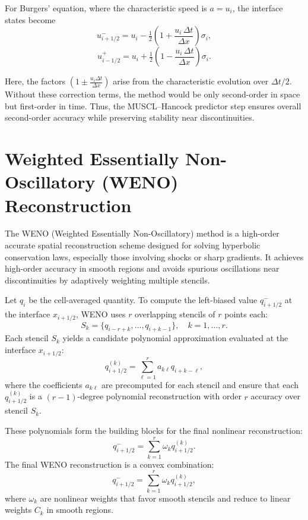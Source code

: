 \documentclass{article}
\begin{document}
For Burgers' equation, where the characteristic speed is $a = u_i$, the interface states become
\begin{equation}
u_{i+1/2}^- = u_i - \tfrac{1}{2}\!\left(1 + \frac{u_i \,\Delta t}{\Delta x}\right)\sigma_i,
\end{equation}
\begin{equation}
u_{i-1/2}^+ = u_i + \tfrac{1}{2}\!\left(1 - \frac{u_i \,\Delta t}{\Delta x}\right)\sigma_i.
\end{equation}

Here, the factors $\left(1 \pm \tfrac{u_i \Delta t}{\Delta x}\right)$ arise from the characteristic evolution over $\Delta t/2$. Without these correction terms, the method would be only second-order in space but first-order in time. Thus, the MUSCL--Hancock predictor step ensures overall second-order accuracy while preserving stability near discontinuities.

\section{Weighted Essentially Non-Oscillatory (WENO) Reconstruction}

The WENO (Weighted Essentially Non-Oscillatory) method is a high-order accurate spatial reconstruction scheme designed for solving hyperbolic conservation laws, especially those involving shocks or sharp gradients. It achieves high-order accuracy in smooth regions and avoids spurious oscillations near discontinuities by adaptively weighting multiple stencils.

Let $q_i$ be the cell-averaged quantity. To compute the left-biased value $q_{i+1/2}^-$ at the interface $x_{i+1/2}$, WENO uses $r$ overlapping stencils of $r$ points each:
\[
S_k = \{ q_{i - r + k}, \dots, q_{i + k - 1} \}, \quad k = 1, \dots, r.
\]
Each stencil $S_k$ yields a candidate polynomial approximation evaluated at the interface $x_{i+1/2}$:
\[
q^{(k)}_{i+1/2} = \sum_{\ell=1}^r a_{k\ell} q_{i + k - \ell},
\]
where the coefficients $a_{k\ell}$ are precomputed for each stencil and ensure that each $q^{(k)}_{i+1/2}$ is a $(r-1)$-degree polynomial reconstruction with order $r$ accuracy over stencil $S_k$.

These polynomials form the building blocks for the final nonlinear reconstruction:
\[
q_{i+1/2}^- = \sum_{k=1}^r \omega_k q^{(k)}_{i+1/2}.
\] 
The final WENO reconstruction is a convex combination:
\[
q_{i+1/2}^- = \sum_{k=1}^r \omega_k q^{(k)}_{i+1/2},
\]
where $\omega_k$ are nonlinear weights that favor smooth stencils and reduce to linear weights $C_k$ in smooth regions.
\end{document}
